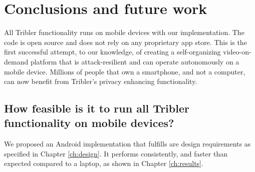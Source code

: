 \chapter{Conclusions and future work}\label{ch:conclusions}

All Tribler functionality runs on mobile devices with our implementation.
The code is open source \cite{github_tribler_repo} and does not rely on any proprietary app store.
This is the first successful attempt, to our knowledge, of creating a self-organizing video-on-demand platform that is attack-resilient and can operate autonomously on a mobile device.
Millions of people that own a smartphone, and not a computer, can now benefit from Tribler's privacy enhancing functionality.


\section{How feasible is it to run all Tribler functionality on mobile devices?} %
We proposed an Android implementation that fulfills are design requirements as specified in Chapter \ref{ch:design}.
It performs consistently, and faster than expected compared to a laptop, as shown in Chapter \ref{ch:results}.

